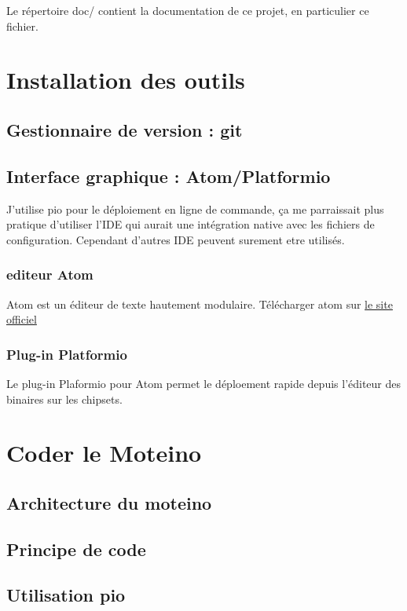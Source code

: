 \documentclass{report}
\begin{document}
Le répertoire doc/ contient la documentation de ce projet, en particulier ce fichier.

\chapter{Installation des outils}

\section{Gestionnaire de version : git}

\section{Interface graphique : Atom/Platformio}

J'utilise pio pour le déploiement en ligne de commande, ça me parraissait plus pratique d'utiliser l'IDE qui aurait une intégration native avec les fichiers de configuration. Cependant d'autres IDE peuvent surement etre utilisés.

\subsection{editeur Atom}

Atom est un éditeur de texte hautement modulaire.
Télécharger atom sur \href{https://atom.io/}{le site officiel}

\subsection{Plug-in Platformio}

Le plug-in Plaformio pour Atom permet le déploement rapide depuis l'éditeur des binaires sur les chipsets.

\chapter{Coder le Moteino}

\section{Architecture du moteino}

\section{Principe de code}

\section{Utilisation pio}
\end{document}
